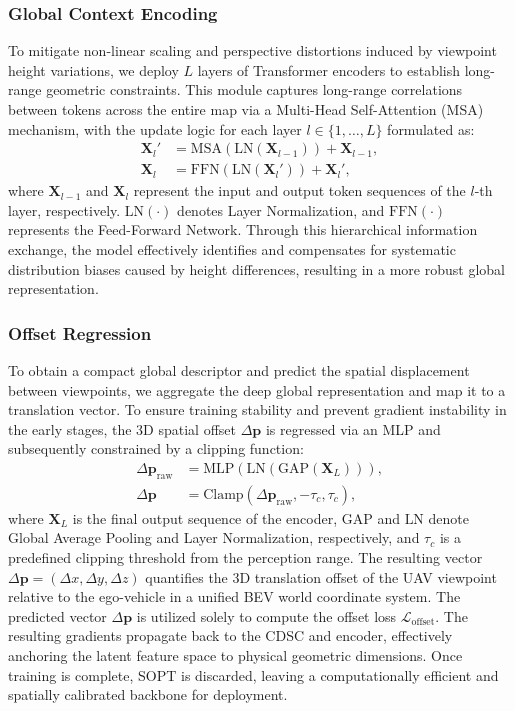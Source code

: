 \documentclass[conference]{IEEEtran}
\begin{document}
\subsubsection{Global Context Encoding} 
To mitigate non-linear scaling and perspective distortions induced by viewpoint height variations, we deploy $L$ layers of Transformer encoders to establish long-range geometric constraints. This module captures long-range correlations between tokens across the entire map via a Multi-Head Self-Attention (MSA) mechanism, with the update logic for each layer $l \in \{1, \dots, L\}$ formulated as:
\begin{align}
    \mathbf{X}_l' &= \text{MSA}(\text{LN}(\mathbf{X}_{l - 1})) + \mathbf{X}_{l - 1}, \\
    \mathbf{X}_l &= \text{FFN}(\text{LN}(\mathbf{X}_l')) + \mathbf{X}_l',
\end{align}
where $\mathbf{X}_{l-1}$ and $\mathbf{X}_{l}$ represent the input and output token sequences of the $l$-th layer, respectively. $\text{LN}(\cdot)$ denotes Layer Normalization, and $\text{FFN}(\cdot)$ represents the Feed-Forward Network. Through this hierarchical information exchange, the model effectively identifies and compensates for systematic distribution biases caused by height differences, resulting in a more robust global representation.

\subsubsection{Offset Regression}
To obtain a compact global descriptor and predict the spatial displacement between viewpoints, we aggregate the deep global representation and map it to a translation vector. To ensure training stability and prevent gradient instability in the early stages, the 3D spatial offset $\Delta \mathbf{p}$ is regressed via an MLP and subsequently constrained by a clipping function:
\begin{align}
    \Delta \mathbf{p}_{\text{raw}} &= \text{MLP}(\text{LN}(\text{GAP}(\mathbf{X}_L))), \\
    \Delta \mathbf{p} &= \text{Clamp}(\Delta \mathbf{p}_{\text{raw}}, -\tau_c, \tau_c),
\end{align}
where $\mathbf{X}_L$ is the final output sequence of the encoder, $\text{GAP}$ and $\text{LN}$ denote Global Average Pooling and Layer Normalization, respectively, and $\tau_c$ is a predefined clipping threshold from the perception range. The resulting vector $\Delta \mathbf{p} = (\Delta x, \Delta y, \Delta z)$ quantifies the 3D translation offset of the UAV viewpoint relative to the ego-vehicle in a unified BEV world coordinate system. The predicted vector $\Delta \mathbf{p}$ is utilized solely to compute the offset loss $\mathcal{L}_{\text{offset}}$. The resulting gradients propagate back to the CDSC and encoder, effectively anchoring the latent feature space to physical geometric dimensions. Once training is complete, SOPT is discarded, leaving a computationally efficient and spatially calibrated backbone for deployment.
\end{document}
